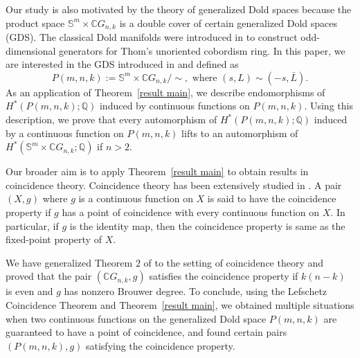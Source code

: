 \documentclass{amsart}
\newcommand{\thmref}[1]{Theorem~\ref{#1}}
\begin{document}
	Our study is also motivated by the theory of generalized Dold spaces because the product space $\mathbb S^m \times \mathbb CG_{n,k}$ is a double cover of certain  generalized Dold spaces (GDS). %
	The classical Dold manifolds were introduced in \cite{dold} to construct odd-dimensional generators for Thom's unoriented cobordism ring. In this paper, we are interested in the GDS introduced in \cite{nath-sankaran} and defined as  %
	\[
	P(m,n,k):=\mathbb S^m\times \mathbb CG_{n,k}/\!\!\sim, \text { where } (s,L)\sim (-s,\bar L).
	\]
	As an application of \thmref{result main}, we describe endomorphisms of $H^*(P(m,n,k);\mathbb{Q})$ induced by continuous functions on $P(m,n,k)$. Using this description, we prove that every automorphism of $H^*(P(m,n,k);\mathbb{Q})$ induced by a continuous function on $P(m,n,k)$ lifts to an automorphism of $H^*(\mathbb S^m\times \mathbb CG_{n,k}; \mathbb{Q})$ if $n>2$. 
	
	Our broader aim is to apply \thmref{result main} to obtain results in coincidence theory. Coincidence theory has been extensively studied in \cite{hoffman-noncoin, glover-homer coin, wong}. %
	A pair $(X,g)$ where $g$ is a continuous function on $X$ is said to have the coincidence property if $g$ has a point of coincidence with every continuous function on $X$. In particular, if $g$ is the identity map, then the coincidence property is same as the fixed-point property of $X$.
	
	We have generalized Theorem $2$ of \cite{glover-homer} to the setting of coincidence theory and proved that the pair $(\mathbb{C}G_{n,k},g)$ satisfies the coincidence property if $k(n-k)$ is even and $g$ has nonzero Brouwer degree.
	To conclude, using the Lefschetz Coincidence Theorem and \thmref{result main}, we obtained multiple situations when two continuous functions on the generalized Dold space $P(m,n,k)$ are guaranteed to have a point of coincidence, and found certain pairs $(P(m,n,k),g)$ satisfying the coincidence property.
	
\end{document}
